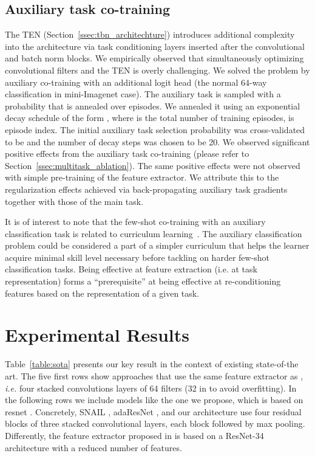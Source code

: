 \documentclass{article}
\begin{document}
\subsection{Auxiliary task co-training} \label{ssec:theory_multitask}

The TEN (Section~\ref{ssec:tbn_architechture}) introduces additional complexity into the architecture via task conditioning layers inserted after the convolutional and batch norm blocks. We empirically observed that simultaneously optimizing convolutional filters and the TEN is overly challenging. We solved the problem by auxiliary co-training with an additional logit head (the normal 64-way classification in mini-Imagenet case). The auxiliary task is sampled with a probability that is annealed over episodes. We annealed it using an exponential decay schedule of the form , where  is the total number of training episodes,  is episode index. The initial auxiliary task selection probability was cross-validated to be  and the number of decay steps was chosen to be 20. We observed significant positive effects from the auxiliary task co-training (please refer to Section~\ref{ssec:multitask_ablation}). The same positive effects were not observed with simple pre-training of the feature extractor. We attribute this to the regularization effects achieved via back-propagating auxiliary task gradients together with those of the main task.

It is of interest to note that the few-shot co-training with an auxiliary classification task is related to curriculum learning~\citep{Santoro16metalearning}. The auxiliary classification problem could be considered a part of a simpler curriculum that helps the learner acquire minimal skill level necessary before tackling on harder few-shot classification tasks. Being effective at feature extraction (i.e. at task representation) forms a ``prerequisite'' at being effective at re-conditioning features based on the representation of a given task.

\section{Experimental Results}\label{sec:experiments}

Table~\ref{table:sota} presents our key result in the context of existing state-of-the art. The five first rows show approaches that use the same feature extractor as \citep{vinyals2016matching}, \emph{i.e.} four stacked convolutions layers of 64 filters (32 in \cite{ravi2016optimization, finn2017model} to avoid overfitting). In the following rows we include models like the one we propose, which is based on resnet \cite{He2016Deep}. Concretely, SNAIL \cite{mishra2018simle}, adaResNet \cite{munkhdalai2018rapid}, and our architecture use four residual blocks of three stacked  convolutional layers, each block followed by max pooling. Differently, the feature extractor proposed in \cite{Bauer2017discriminative} is based on a ResNet-34 architecture with a reduced number of features. 
\end{document}
